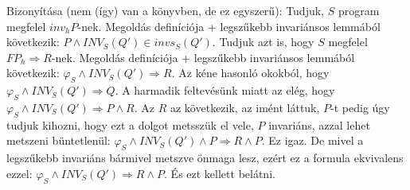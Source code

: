 \documentclass{article}
\begin{document}
Bizonyítása (nem (így) van a könyvben, de ez egyszerű): Tudjuk, $S$ program megfelel $inv_h P$-nek. Megoldás definíciója + legszűkebb invariánsos lemmából következik: $P \land INV_S(Q') \in invs_S (Q')$. Tudjuk azt is, hogy $S$ megfelel $FP_h \Rightarrow R$-nek. Megoldás definíciója + legszűkebb invariánsos lemmából következik: $\varphi_S \land INV_S(Q') \Rightarrow R$. Az kéne hasonló okokból, hogy $\varphi_S \land INV_S(Q') \Rightarrow Q$. A harmadik feltevésünk miatt az elég, hogy $\varphi_S \land INV_S(Q') \Rightarrow P \land R$. Az $R$ az következik, az imént láttuk, $P$-t pedig úgy tudjuk kihozni, hogy ezt a dolgot metsszük el vele, $P$ invariáns, azzal lehet metszeni büntetlenül: $\varphi_S \land INV_S(Q') \land P \Rightarrow R \land P$. Ez igaz. De mivel a legszűkebb invariáns bármivel metszve önmaga lesz, ezért ez a formula ekvivalens ezzel: $\varphi_S \land INV_S(Q') \Rightarrow R \land P$. És ezt kellett belátni.
\end{document}
